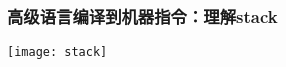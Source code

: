
\begin{frame}
	\frametitle{高级语言编译到机器指令：\small{理解stack}}
\small 
	
	\centering
	\texttt{[image: stack]}
	
	
\end{frame}



